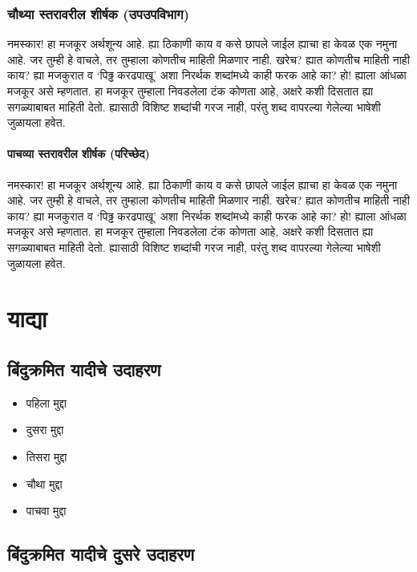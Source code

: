 \subsubsection{चौथ्या स्तरावरील शीर्षक (उपउपविभाग)}
नमस्कार! हा मजकूर अर्थशून्य आहे. ह्या ठिकाणी काय व कसे छापले जाईल ह्याचा हा केवळ एक नमुना
आहे. जर तुम्ही हे वाचले, तर तुम्हाला कोणतीच माहिती मिळणार नाही. खरेच? ह्यात कोणतीच माहिती
नाही काय? ह्या मजकुरात व `पिढ्ढ करढपाखू' अशा निरर्थक शब्दांमध्ये काही फरक आहे का? हो!
ह्याला आंधळा मजकूर असे म्हणतात. हा मजकूर तुम्हाला निवडलेला टंक कोणता आहे, अक्षरे कशी दिसतात
ह्या सगळ्याबाबत माहिती देतो. ह्यासाठी विशिष्ट शब्दांची गरज नाही, परंतु शब्द वापरल्या गेलेल्या
भाषेशी जुळायला हवेत.

\paragraph{पाचव्या स्तरावरील शीर्षक (परिच्छेद)}
नमस्कार! हा मजकूर अर्थशून्य आहे. ह्या ठिकाणी काय व कसे छापले जाईल ह्याचा हा केवळ एक नमुना
आहे. जर तुम्ही हे वाचले, तर तुम्हाला कोणतीच माहिती मिळणार नाही. खरेच? ह्यात कोणतीच माहिती
नाही काय? ह्या मजकुरात व `पिढ्ढ करढपाखू' अशा निरर्थक शब्दांमध्ये काही फरक आहे का? हो!
ह्याला आंधळा मजकूर असे म्हणतात. हा मजकूर तुम्हाला निवडलेला टंक कोणता आहे, अक्षरे कशी दिसतात
ह्या सगळ्याबाबत माहिती देतो. ह्यासाठी विशिष्ट शब्दांची गरज नाही, परंतु शब्द वापरल्या गेलेल्या
भाषेशी जुळायला हवेत.

\section{याद्या}

\subsection{बिंदुक्रमित यादीचे उदाहरण}

\begin{itemize}
\item पहिला मुद्दा
\item दुसरा मुद्दा
\item तिसरा मुद्दा
\item चौथा मुद्दा
\item पाचवा मुद्दा
\end{itemize}

\subsection*{बिंदुक्रमित यादीचे दुसरे उदाहरण}

